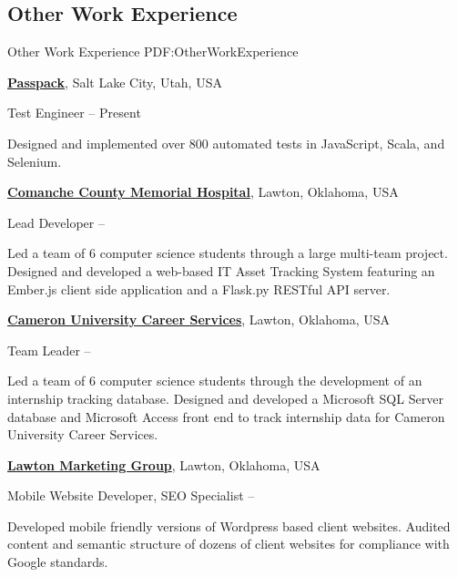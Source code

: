 \documentclass[letterpaper,10pt,oneside]{article}
\begin{document}
\begin{body}
\section
{Other Work\newline
Experience}
{Other Work Experience}
{PDF:OtherWorkExperience}

\href{http://www.example.com/my-company}
{\textbf{Passpack}},
Salt Lake City, Utah, USA
\par
Test Engineer
\hfill
{} -- Present
\begin{detail}
\BulletItem
Designed and implemented over 800 automated tests in JavaScript, Scala, and Selenium. 
\end{detail}

\EntryGap

\href{http://www.example.com/my-company}
{\textbf{Comanche County Memorial Hospital}},
Lawton, Oklahoma, USA
\par
Lead Developer
\hfill
{} -- 
\begin{detail}
\BulletItem
Led a team of 6 computer science students through a large multi-team project.
\BulletItem
Designed and developed a web-based IT Asset Tracking System featuring an Ember.js client side application and a Flask.py RESTful API server.
\end{detail}

\EntryGap

\href{http://www.example.com/my-company}
{\textbf{Cameron University Career Services}},
Lawton, Oklahoma, USA
\par
Team Leader
\hfill
{} -- 
\begin{detail}
	\BulletItem
	Led a team of 6 computer science students through the development of an internship tracking database.
	\BulletItem
	Designed and developed a Microsoft SQL Server database and Microsoft Access front end to track internship data for Cameron University Career Services.
\end{detail}

\EntryGap

\href{http://www.example.com/my-company}
{\textbf{Lawton Marketing Group}},
Lawton, Oklahoma, USA
\par
Mobile Website Developer, SEO Specialist
\hfill
{} --
\begin{detail}
	\BulletItem
	Developed mobile friendly versions of Wordpress based client websites.
	\BulletItem
	Audited content and semantic structure of dozens of client websites for compliance with Google standards.
\end{detail}


\end{body}
\end{document}
